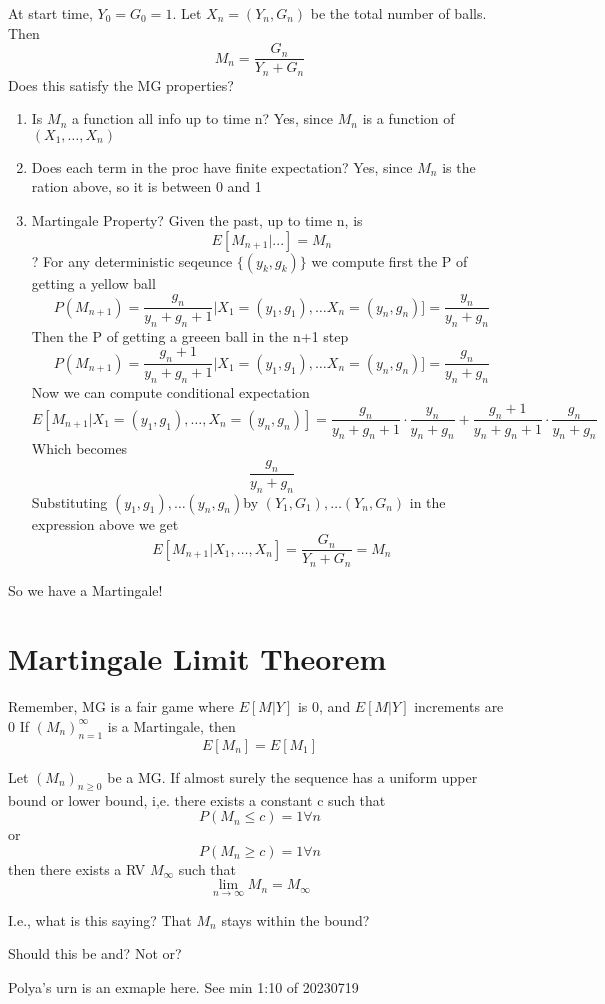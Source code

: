 \documentclass{report}
\begin{document}
    At start time, $Y_0 = G_0 = 1$.  Let $X_n = (Y_n, G_n)$ be the total
    number of balls.  Then 
      \[ M_n = \frac{G_n}{Y_n + G_n}  \]
    Does this satisfy the MG properties?
    \begin{enumerate}
      \item Is $M_n$ a function all info up to time n?  Yes, since $M_n$
        is a function of $(X_1, \dots, X_n)$
      \item Does each term in the proc have finite expectation?  Yes,
        since $M_n$ is the ration above, so it is between 0 and 1
      \item Martingale Property?  Given the past, up to time n, is
        \[ E[M_{n+1}| ... ] = M_n\] ?
        For any deterministic seqeunce $\{(y_k, g_k)\}$ we compute first
        the P of getting a yellow ball
        \[ P(M_{n+1}) = \frac{g_n}{y_n+g_n+1}   | X_1=(y_1, g_1), \dots X_n=(y_n,g_n)] = \frac{y_n}{y_n+g_n} \]
        Then the P of getting a greeen ball in the n+1 step
        \[ P(M_{n+1}) = \frac{g_n+1}{y_n+g_n+1}   | X_1=(y_1, g_1), \dots X_n=(y_n,g_n)] = \frac{g_n}{y_n+g_n} \]
        Now we can compute conditional expectation 
        \[ E[M_{n+1}|X_1=(y_1, g_1), \dots, X_n=(y_n,g_n)] = \frac{g_n}{y_n+g_n+1}  \cdot \frac{y_n}{y_n+g_n}  + \frac{g_n+1}{y_n+g_n+1}  \cdot  \frac{g_n}{y_n+g_n} \]
        Which becomes
        \[ \frac{g_n}{y_n+g_n}  \]
    Substituting $(y_1,g_1), \dots (y_n,g_n)$by $(Y_1,G_1),
    \dots (Y_n,G_n)$ in the expression above we get
    \[ E[M_{n+1}|X_1, \dots, X_n] = \frac{G_n}{Y_n+G_n} = M_n \]
    \end{enumerate}
    So we have a Martingale!

    \section{Martingale Limit Theorem}%
    Remember, MG is a fair game where $E[M|Y]$ is 0, and $E[M|Y]$ increments
    are 0
     {
      If $(M_n)^{\infty}_{n=1}$ is a Martingale, then
      \[ E[M_n] = E[M_1] \]
    }
     {
      Let $(M_n)_{n \geq 0}$ be a MG.  If almost surely the sequence
      has a uniform upper bound or lower bound, i,e. there exists a
      constant c such that 
        \[ P(M_n \leq c) = 1 \forall n \]
        or
        \[ P(M_n \geq c) = 1 \forall n \]
        then there exists a RV $M_{\infty}$ such that
        \[ \lim_{n \to \infty} M_n = M_{\infty} \]

        I.e., what is this saying?  That $M_n$ stays within the bound?

        Should this be and?  Not or?

        Polya's urn is an exmaple here.  See min 1:10 of 20230719
    }
\end{document}
